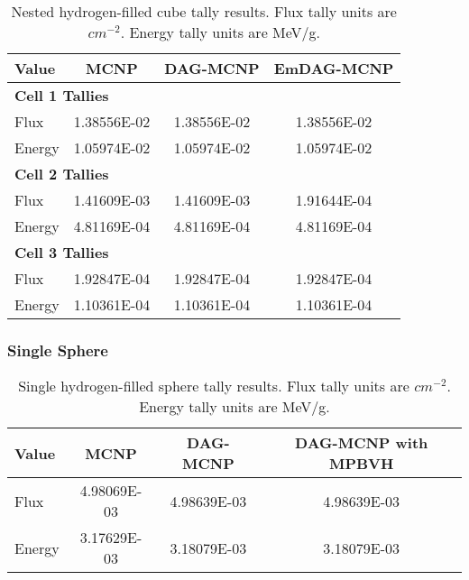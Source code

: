   \begin{table}[H]
    \small
    \begin{center}
      \begin{tabular}{lccc}
        \toprule
        Value & MCNP & DAG-MCNP & EmDAG-MCNP \\
        \toprule
        \multicolumn{4}{l}{\textbf{Cell 1 Tallies}} \\
        \hline
        Flux    &  1.38556E-02 & 1.38556E-02 & 1.38556E-02 \\
        Energy  &  1.05974E-02 & 1.05974E-02 & 1.05974E-02 \\
        \hline
        \multicolumn{4}{l}{\textbf{Cell 2 Tallies}} \\
        \hline
        Flux    & 1.41609E-03 & 1.41609E-03 & 1.91644E-04 \\
        Energy  & 4.81169E-04 & 4.81169E-04 & 4.81169E-04 \\
        \hline
        \multicolumn{4}{l}{\textbf{Cell 3 Tallies}} \\
        \hline
        Flux    & 1.92847E-04 &  1.92847E-04 & 1.92847E-04 \\
        Energy  & 1.10361E-04 &  1.10361E-04 & 1.10361E-04 \\
        \bottomrule
        
      \end{tabular}
      \caption[Nested hydrogen-filled cube tally results.]{Nested
        hydrogen-filled cube tally results. Flux tally units are
        $cm^{-2}$. Energy tally units are MeV/g.}
      \label{nestedspheres}
    \end{center}
  \end{table}


  \subsubsection{Single Sphere}

  \begin{table}[H]
    \small
    \begin{center}
      \begin{tabular}{lccc}
        \toprule
        Value & MCNP & DAG-MCNP & DAG-MCNP with MPBVH \\
        \toprule
        \hline
        Flux   & 4.98069E-03 & 4.98639E-03 & 4.98639E-03 \\
        Energy & 3.17629E-03 & 3.18079E-03 & 3.18079E-03 \\
        \bottomrule
      \end{tabular}
      \caption[Single hydrogen-filled sphere tally results.]{Single
        hydrogen-filled sphere tally results. Flux tally units are
        $cm^{-2}$. Energy tally units are MeV/g.}
      \label{nestedspheres}
    \end{center}
  \end{table}


